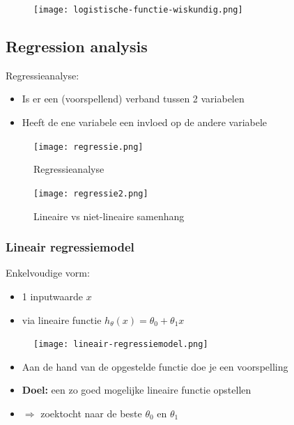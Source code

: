 \documentclass{article}
\begin{document}
\begin{figure}[H]
    \centering
    \texttt{[image: logistische-functie-wiskundig.png]}
\end{figure}

\subsection{Regression analysis}

Regressieanalyse:

\begin{itemize}
    \item Is er een (voorspellend) verband tussen 2 variabelen
    \item Heeft de ene variabele een invloed op de andere variabele
\end{itemize}

\begin{figure}[H]
    \centering
    \texttt{[image: regressie.png]}
    \caption{Regressieanalyse}
\end{figure}

\begin{figure}[H]
    \centering
    \texttt{[image: regressie2.png]}
    \caption{Lineaire vs niet-lineaire samenhang}
\end{figure}


\subsubsection{Lineair regressiemodel}

Enkelvoudige vorm: 

\begin{itemize}
    \item 1 inputwaarde $x$
    \item via lineaire functie $h_{\theta}(x) = \theta_0 + \theta_1x$
\end{itemize}

\begin{figure}[H]
    \centering
    \texttt{[image: lineair-regressiemodel.png]}
\end{figure}

\begin{itemize}
    \item Aan de hand van de opgestelde functie doe je een voorspelling
    \item \textbf{Doel:} een zo goed mogelijke lineaire functie opstellen
    \item $\Rightarrow$ zoektocht naar de beste $\theta_0$ en $\theta_1$
\end{itemize}
\end{document}
